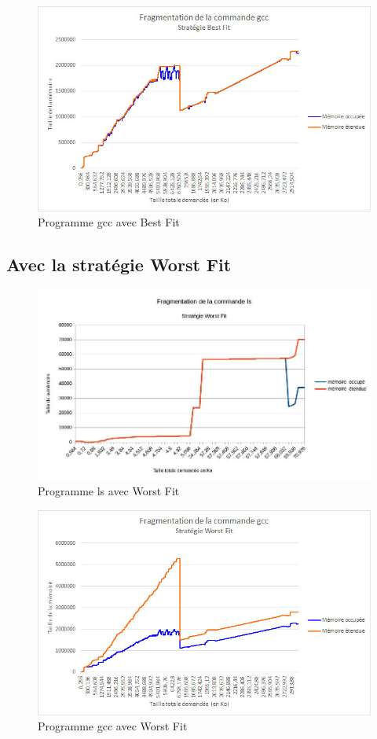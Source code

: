 \documentclass{article}
\begin{document}
\begin{figure}[h]
	\centering
	\includegraphics[width=12cm]{gcc_bestfit.jpg}
	\caption{Programme gcc avec Best Fit}
\end{figure}

\newpage
\subsection{Avec la stratégie Worst Fit}
\begin{figure}[h]
	\centering
	\includegraphics[width=14cm]{ls_worstfit.jpg}
	\caption{Programme ls avec Worst Fit}
\end{figure}

\begin{figure}[h]
	\centering
	\includegraphics[width=12cm]{gcc_worstfit.jpg}
	\caption{Programme gcc avec Worst Fit}
\end{figure}
\end{document}
